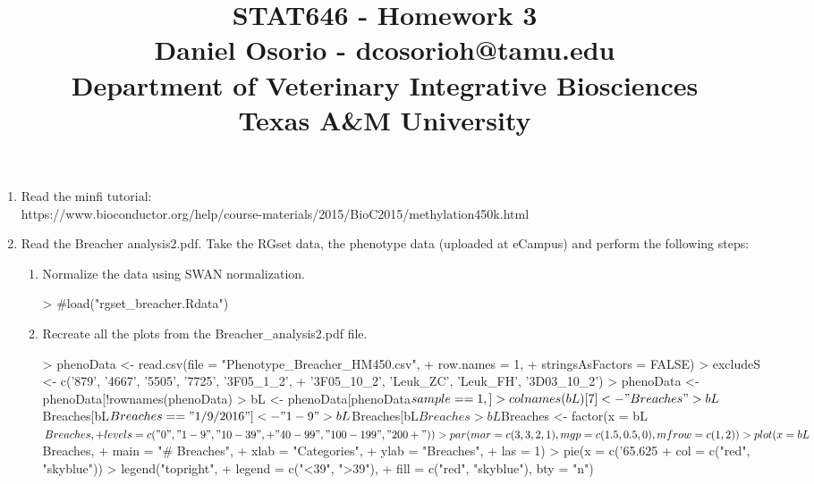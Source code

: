 \documentclass[12pt,a4paper]{paper}
\begin{document}
\title{STAT646 - Homework 3\\\small{Daniel Osorio - dcosorioh@tamu.edu\\Department of Veterinary Integrative Biosciences\\Texas A\&M University}}
\maketitle

\begin{enumerate}
\item Read the minfi tutorial: \\https://www.bioconductor.org/help/course-materials/2015/BioC2015/methylation450k.html
\item Read the Breacher analysis2.pdf. Take the RGset data, the phenotype data (uploaded at eCampus) and perform the following steps:
\begin{enumerate}
\item Normalize the data using SWAN normalization.
\begin{Schunk}
\begin{Sinput}
> #load("rgset_breacher.Rdata")
\end{Sinput}
\end{Schunk}
\item Recreate all the plots from the Breacher\_analysis2.pdf file.
\begin{Schunk}
\begin{Sinput}
> phenoData <- read.csv(file = "Phenotype_Breacher_HM450.csv", 
+                       row.names = 1, 
+                       stringsAsFactors = FALSE)
> excludeS <- c('879', '4667', '5505', '7725', '3F05_1_2', 
+               '3F05_10_2', 'Leuk_ZC', 'Leuk_FH', '3D03_10_2')
> phenoData <- phenoData[!rownames(phenoData) %
> bL <- phenoData[phenoData$sample == 1,]
> colnames(bL)[7] <- "Breaches"
> bL$Breaches[bL$Breaches == "1/9/2016"] <- "1-9"
> bL$Breaches[bL$Breaches %
> bL$Breaches <- factor(x = bL$Breaches, 
+                       levels = c("0", "1-9", "10-39", 
+                                  "40-99", "100-199", "200+"))
> par(mar=c(3,3,2,1), mgp = c(1.5,0.5,0), mfrow = c(1,2))
> plot(x = bL$Breaches, 
+      main = "# Breaches", 
+      xlab = "Categories", 
+      ylab = "Breaches",
+      las = 1)
> pie(x = c('65.625%
+     col = c("red", "skyblue"))
> legend("topright", 
+        legend = c("<39", ">39"), 
+        fill = c("red", "skyblue"), bty = "n")
\end{Sinput}

\end{Schunk}
\end{enumerate}
\end{enumerate}
\end{document}
